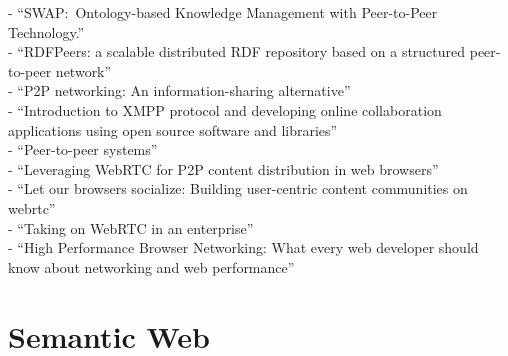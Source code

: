 - ``SWAP:\ Ontology-based Knowledge Management with Peer-to-Peer Technology.'' \citep{ehrig2003swap} \\
- ``RDFPeers: a scalable distributed RDF repository based on a structured peer-to-peer network'' \citep{cai2004rdfpeers} \\
- ``P2P networking: An information-sharing alternative'' \citep{parameswaran2001p2p} \\
- ``Introduction to XMPP protocol and developing online collaboration applications using open source software and libraries'' \citep{ozturk2010introduction} \\
- ``Peer-to-peer systems'' \citep{rodrigues2010peer} \\
- ``Leveraging WebRTC for P2P content distribution in web browsers'' \citep{vogt2013leveraging} \\
- ``Let our browsers socialize: Building user-centric content communities on webrtc'' \citep{werner2014let} \\
- ``Taking on WebRTC in an enterprise'' \citep{vogt2013leveraging} \\
- ``High Performance Browser Networking: What every web developer should know about networking and web performance'' \citep{grigorik2013high}


\section{Semantic Web}
\label{sec:related_semweb}

